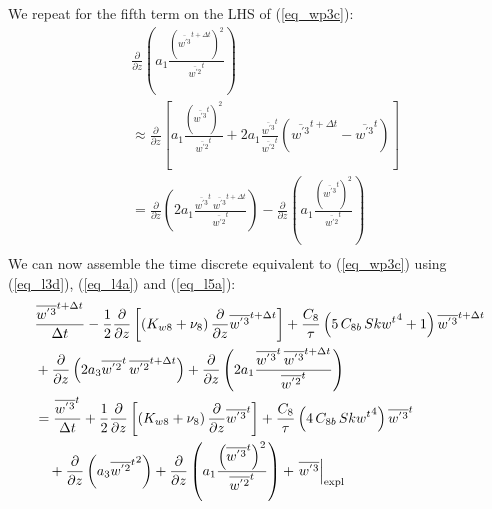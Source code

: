 \documentclass[11pt,fleqn]{article}
\newcommand{\ptlder}[2]{\frac{\partial #1}{\partial #2}}
\begin{document}
%
We repeat for the fifth term on the LHS of (\ref{eq_wp3c}):
%
\begin{equation}
\label{eq_l5a}
\begin{split}
& \ptlder{}{z} 
     \left(
        a_1 \frac{ \left( {\overline{w^{'3}}^{t + \Delta t}}\right)^2 }
                 { \overline{w^{'2}}^t }
     \right) \\
&\approx
  \ptlder{}{z}
  \left[
    a_1 \frac{ \left( {\overline{w^{'3}}^t}\right)^2 }
             { \overline{w^{'2}}^t }
  + 2 a_1 \frac{ \overline{w^{'3}}^t }{ \overline{w^{'2}}^t }
          \left( \overline{w^{'3}}^{t+\Delta t} - \overline{w^{'3}}^{t} \right) 
  \right] \\
&=
  \ptlder{}{z}
  \left(
    2 a_1 \frac{ \overline{w^{'3}}^t \, \overline{w^{'3}}^{t+\Delta t} }
               { \overline{w^{'2}}^t }
  \right)
- \ptlder{}{z}
  \left(
    a_1 \frac{ \left( {\overline{w^{'3}}^t}\right)^2 }
             { \overline{w^{'2}}^t }
  \right) \\
\end{split}
\end{equation}
%
We can now assemble the time discrete equivalent to (\ref{eq_wp3c}) using
(\ref{eq_l3d}), (\ref{eq_l4a}) and (\ref{eq_l5a}):
%
\begin{equation}
\label{eq_wp3d}
\begin{split}
& \frac{\overline{w^{'3}}^{t+\Delta t}}{\Delta t} 
- \frac{1}{2}\ptlder{}{z} \left[ \left( K_{w8} + \nu_8 \right)
                                 \ptlder{}{z} \overline{w^{'3}}^{t+\Delta t} 
                          \right]
+ \frac{C_8}{\tau}
   \left(  5 \, C_{8b} \, {Skw^t}^4 + 1 \right)
   \overline{w^{'3}}^{t + \Delta t}
\\ &
+ \ptlder{}{z} \left( 2 a_3 \overline{w^{'2}}^t \, \overline{w^{'2}}^{t+\Delta t} \right)
+ \ptlder{}{z}
  \left(
    2 a_1 \frac{ \overline{w^{'3}}^t \, \overline{w^{'3}}^{t+\Delta t} }
               { \overline{w^{'2}}^t }
  \right)
\\
&=
  \frac{\overline{w^{'3}}^{t}}{\Delta t} 
  + \frac{1}{2}\ptlder{}{z} \left[ \left( K_{w8} + \nu_8 \right)
                                   \ptlder{}{z} \overline{w^{'3}}^{t} 
                            \right]
  +  \frac{C_8}{\tau}
      \left( 4 \, C_{8b} \, {Skw^t}^4 \right) \overline{w^{'3}}^t
\\ & \quad
  + \ptlder{}{z} \left( a_3 {\overline{w^{'2}}^t}^2 \right)
  + \ptlder{}{z}
    \left(
      a_1 \frac{ \left( {\overline{w^{'3}}^t}\right)^2 }
               { \overline{w^{'2}}^t }
    \right)
  + \left. \overline{w^{'3}} \right|_{\rm expl}
\end{split}
\end{equation}
\end{document}
